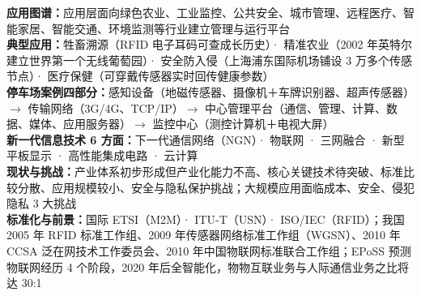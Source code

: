 \documentclass[a4paper,11pt]{article}
\begin{document}

\begin{knowmap}
\textbf{应用图谱：}应用层面向绿色农业、工业监控、公共安全、城市管理、远程医疗、智能家居、智能交通、环境监测等行业建立管理与运行平台\\[2pt]
\textbf{典型应用：}牲畜溯源（RFID 电子耳码可查成长历史）· 精准农业（2002 年英特尔建立世界第一个无线葡萄园）· 安全防入侵（上海浦东国际机场铺设 3 万多个传感节点）· 医疗保健（可穿戴传感器实时回传健康参数）\\[2pt]
\textbf{停车场案例四部分：}感知设备（地磁传感器、摄像机＋车牌识别器、超声传感器）$\rightarrow$ 传输网络（3G/4G、TCP/IP）$\rightarrow$ 中心管理平台（通信、管理、计算、数据、媒体、应用服务器）$\rightarrow$ 监控中心（测控计算机＋电视大屏）\\[2pt]
\textbf{新一代信息技术 6 方面：}下一代通信网络（NGN）· 物联网 · 三网融合 · 新型平板显示 · 高性能集成电路 · 云计算\\[2pt]
\textbf{现状与挑战：}产业体系初步形成但产业化能力不高、核心关键技术待突破、标准比较分散、应用规模较小、安全与隐私保护挑战；大规模应用面临成本、安全、侵犯隐私 3 大挑战\\[2pt]
\textbf{标准化与前景：}国际 ETSI（M2M）· ITU-T（USN）· ISO/IEC（RFID）；我国 2005 年 RFID 标准工作组、2009 年传感器网络标准工作组（WGSN）、2010 年 CCSA 泛在网技术工作委员会、2010 年中国物联网标准联合工作组；EPoSS 预测物联网经历 4 个阶段，2020 年后全智能化，物物互联业务与人际通信业务之比将达 30:1
\end{knowmap}
\end{document}
